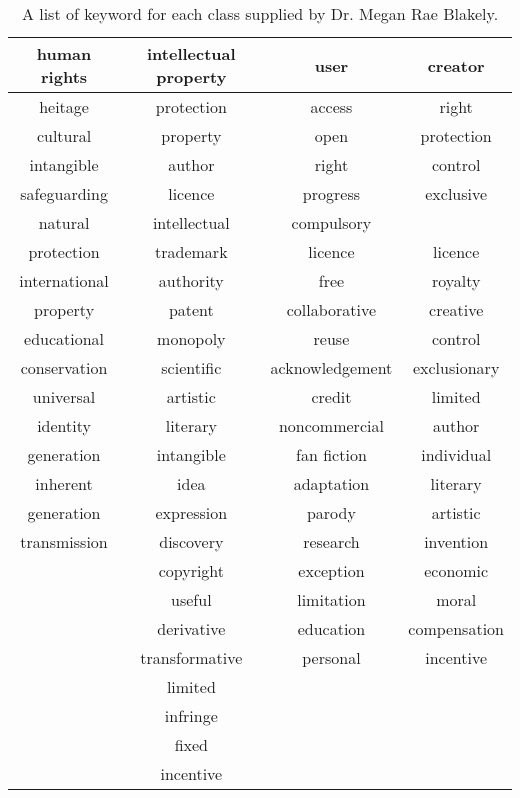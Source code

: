		\begin{table}
			\centering
			\begin{tabular}{c|c|c|c}
				\hline
				human rights&intellectual property&user&creator\\
				\hline
				heitage&protection&access&right\\
				cultural&property&open&protection\\
				intangible&author&right&control\\
				safeguarding&licence&progress&exclusive\\
				natural&intellectual&compulsory&\\
				protection&trademark&licence&licence\\
				international&authority&free&royalty\\
				property&patent&collaborative&creative\\
				educational&monopoly&reuse&control\\
				conservation&scientific&acknowledgement&exclusionary\\
				universal&artistic&credit&limited\\
				identity&literary&noncommercial&author\\
				generation&intangible&fan fiction&individual\\
				inherent&idea&adaptation&literary\\
				generation&expression&parody&artistic\\
				transmission&discovery&research&invention\\
				&copyright&exception&economic\\
				&useful&limitation&moral\\
				&derivative&education&compensation\\
				&transformative&personal&incentive\\
				&limited&&\\
				&infringe&&\\
				&fixed&&\\
				&incentive&&\\
			\end{tabular}
			\caption{A list of keyword for each class supplied by Dr. Megan Rae Blakely.}\label{tab:keyword-list}
		\end{table}